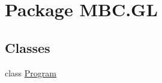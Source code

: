 \hypertarget{namespace_m_b_c_1_1_g_l}{\section{Package M\-B\-C.\-G\-L}
\label{namespace_m_b_c_1_1_g_l}
}
\subsection*{Classes}
\begin{DoxyCompactItemize}
\item 
class \hyperlink{class_m_b_c_1_1_g_l_1_1_program}{Program}
\end{DoxyCompactItemize}
